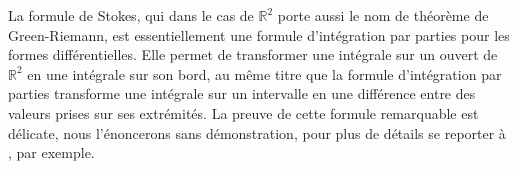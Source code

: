 La formule de Stokes, qui dans le cas de $\mathbb{R}^2$ porte aussi le nom de
théorème de Green-Riemann, est essentiellement une formule d'intégration par
parties pour les formes différentielles. Elle permet de transformer une
intégrale sur un ouvert de $\mathbb{R}^2$ en une intégrale sur son bord, au même
titre que la formule d'intégration par parties transforme une intégrale sur un
intervalle en une différence entre des valeurs prises sur ses extrémités.
La preuve de cette formule remarquable est délicate, nous l'énoncerons sans démonstration, pour plus de détails se reporter à \cite{cartan1977}, par exemple.  

%
